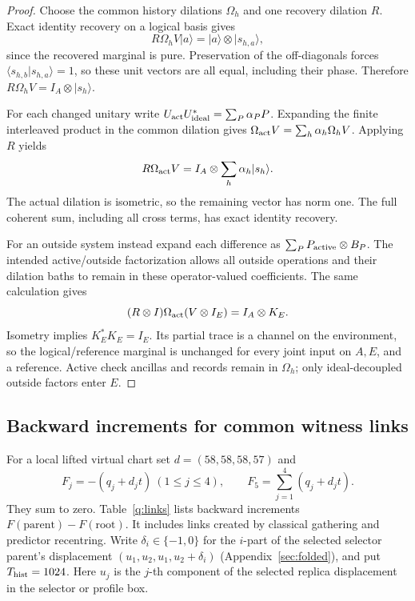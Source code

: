 \begin{proof}
Choose the common history dilations \(\Omega_h\) and one recovery dilation
\(R\). Exact identity recovery on a logical basis gives
\[
 R\Omega_hV|a\rangle=|a\rangle\otimes|s_{h,a}\rangle,
\]
since the recovered marginal is pure. Preservation of the
off-diagonals forces
\(\langle s_{h,b}|s_{h,a}\rangle=1\), so these unit vectors are
all equal, including their phase. Therefore
\(R\Omega_hV=I_A\otimes|s_h\rangle\).

For each changed unitary write
\(U_{\rm act}U_{\rm ideal}^*=\sum_P\alpha_P P\).
Expanding the finite interleaved product in the common dilation gives
\(\Omega_{\rm act}V=\sum_h\alpha_h\Omega_hV\). Applying \(R\) yields
\[
 R\Omega_{\rm act}V=I_A\otimes\sum_h\alpha_h|s_h\rangle.
\]
The actual dilation is isometric, so the remaining vector has norm
one. The full coherent sum, including all cross terms, has exact
identity recovery.

For an outside system instead expand each difference as
\(\sum_P P_{\rm active}\otimes B_P\). The intended active/outside
factorization allows all outside operations and their dilation
baths to remain in these operator-valued coefficients. The same
calculation gives
\[
 (R\otimes I)\Omega_{\rm act}(V\otimes I_E)=I_A\otimes K_E.
\]
Isometry implies \(K_E^*K_E=I_E\). Its partial trace is a channel
on the environment, so the logical/reference marginal is unchanged
for every joint input on \(A,E\), and a reference. Active check
ancillas and records remain in \(\Omega_h\); only ideal-decoupled
outside factors enter \(E\).
\end{proof}

\subsection{Backward increments for common witness links}\label{q:link-section}
For a local lifted virtual chart set \(d=(58,58,58,57)\) and
\begin{equation}\label{q:walls}
 F_j=-(q_j+d_jt)\ (1\le j\le4),\qquad
 F_5=\sum_{j=1}^4(q_j+d_jt).
\end{equation}
They sum to zero. Table~\ref{q:links} lists backward increments
\(F(\text{parent})-F(\text{root})\). It includes links created by
classical gathering and predictor recentring. Write
\(\delta_i\in\{-1,0\}\) for the \(i\)-part of the selected selector parent's displacement \((u_1,u_2,u_1,u_2+\delta_i)\) (Appendix~\ref{sec:folded}), and put \(T_{\rm hist}=1024\). Here \(u_j\) is the \(j\)-th component of the selected replica displacement in the selector or profile box.

